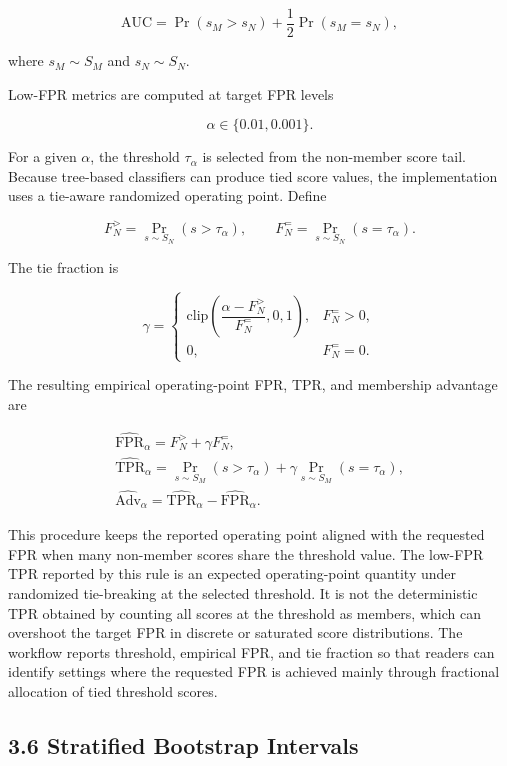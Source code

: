 \documentclass[
  10pt,
  twocolumn]{article}
\begin{document}
\[
\mathrm{AUC} =
\Pr(s_M > s_N) + \frac{1}{2}\Pr(s_M = s_N),
\]

where \(s_M \sim S_M\) and \(s_N \sim S_N\).

Low-FPR metrics are computed at target FPR levels

\[
\alpha \in \{0.01, 0.001\}.
\]

For a given \(\alpha\), the threshold \(\tau_{\alpha}\) is selected from the non-member score tail. Because tree-based classifiers can produce tied score values, the implementation uses a tie-aware randomized operating point. Define

\[
F_N^> = \Pr_{s \sim S_N}(s > \tau_{\alpha}), \qquad
F_N^= = \Pr_{s \sim S_N}(s = \tau_{\alpha}).
\]

The tie fraction is

\[
\gamma =
\begin{cases}
\mathrm{clip}\left(\dfrac{\alpha - F_N^>}{F_N^=}, 0, 1\right), & F_N^= > 0,\\
0, & F_N^= = 0.
\end{cases}
\]

The resulting empirical operating-point FPR, TPR, and membership advantage are

\[
\begin{aligned}
\hat{\mathrm{FPR}}_{\alpha}
= F_N^> + \gamma F_N^=,\\
\hat{\mathrm{TPR}}_{\alpha}
= \Pr_{s \sim S_M}(s > \tau_{\alpha})
+ \gamma \Pr_{s \sim S_M}(s = \tau_{\alpha}),\\
\hat{\mathrm{Adv}}_{\alpha}
= \hat{\mathrm{TPR}}_{\alpha}
- \hat{\mathrm{FPR}}_{\alpha}.
\end{aligned}
\]

This procedure keeps the reported operating point aligned with the requested FPR when many non-member scores share the threshold value. The low-FPR TPR reported by this rule is an expected operating-point quantity under randomized tie-breaking at the selected threshold. It is not the deterministic TPR obtained by counting all scores at the threshold as members, which can overshoot the target FPR in discrete or saturated score distributions. The workflow reports threshold, empirical FPR, and tie fraction so that readers can identify settings where the requested FPR is achieved mainly through fractional allocation of tied threshold scores.

\hypertarget{stratified-bootstrap-intervals}{%
\subsection{3.6 Stratified Bootstrap Intervals}\label{stratified-bootstrap-intervals}}
\end{document}
